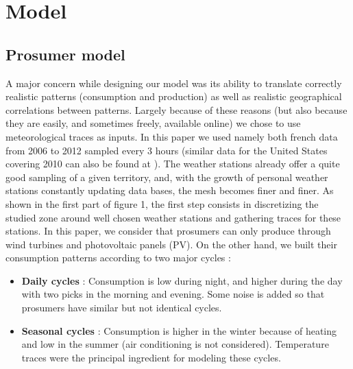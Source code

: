\documentclass[conference]{IEEEtran}
\begin{document}
%
%

\section{Model}
\label{sec:model}
\subsection{Prosumer model}\label{subsec:ProsumerModel}

A major concern while designing our model was its ability to translate correctly realistic patterns (consumption and production) as well as realistic geographical correlations between patterns. Largely because of these reasons (but also because they are easily, and sometimes freely, available online) we chose to use meteorological traces as inputs. In this paper we used namely both french data from 2006 to 2012 sampled every 3 hours \cite{Infoclimat} (similar data for the United States covering 2010 can also be found at \cite{NCDC}). The weather stations already offer a quite good sampling of a given territory, and, with the growth of personal weather stations constantly updating data bases, the mesh becomes finer and finer. As shown in the first part of figure 1, the first step consists in discretizing the studied zone around well chosen weather stations and gathering traces for these stations. In this paper, we consider that prosumers can only produce through wind turbines and photovoltaic panels (PV). On the other hand, we built their consumption patterns according to two major cycles :
\begin{itemize}
\item \textbf{Daily cycles} : Consumption is low during night, and higher during the day with two picks in the morning and evening. Some noise is added so that prosumers have similar but not identical cycles.
\item \textbf{Seasonal cycles} : Consumption is higher in the winter because of heating and low in the summer (air conditioning is not considered). Temperature traces were the principal ingredient for modeling these cycles.
\end{itemize} 
\end{document}
